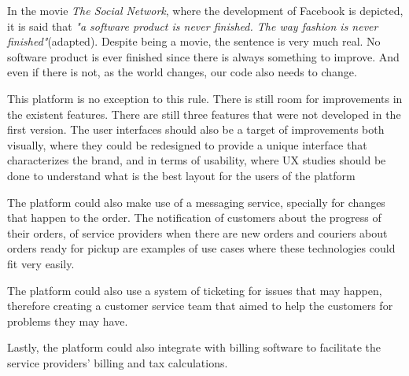 In the movie \textit{The Social Network}, where the development of Facebook is depicted, it is said that \textit{"a software product is never finished. The way fashion is never finished"}(adapted). Despite being a movie, the sentence is very much real. No software product is ever finished since there is always something to improve. And even if there is not, as the world changes, our code also needs to change.
\par
This platform is no exception to this rule. There is still room for improvements in the existent features. There are still three features that were not developed in the first version. The user interfaces should also be a target of improvements both visually, where they could be redesigned to provide a unique interface that characterizes the brand, and in terms of usability, where \gls{UX} studies should be done to understand what is the best layout for the users of the platform
\par
The platform could also make use of a messaging service, specially for changes that happen to the order. The notification of customers about the progress of their orders, of service providers when there are new orders and couriers about orders ready for pickup are examples of use cases where these technologies could fit very easily.
\par
The platform could also use a system of ticketing for issues that may happen, therefore creating a customer service team that aimed to help the customers for problems they may have.
\par
Lastly, the platform could also integrate with billing software to facilitate the service providers' billing and tax calculations.